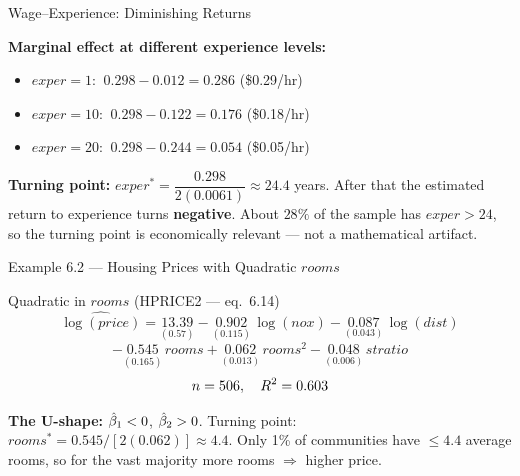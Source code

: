 \documentclass[aspectratio=169, 12pt]{beamer}
\begin{document}
\begin{frame}{Wage--Experience: Diminishing Returns}

  \textbf{Marginal effect at different experience levels:}
  \begin{itemize}
    \item $exper = 1$: $\ 0.298 - 0.012 = 0.286$ (\$0.29/hr)
    \item $exper = 10$: $\ 0.298 - 0.122 = 0.176$ (\$0.18/hr)
    \item $exper = 20$: $\ 0.298 - 0.244 = 0.054$ (\$0.05/hr)
  \end{itemize}

  \medskip

  \begin{keybox}
    \textbf{Turning point:}
    $exper^* = \dfrac{0.298}{2(0.0061)} \approx 24.4$ years. After that the estimated
    return to experience turns \textbf{negative}. About $28\%$ of the sample has
    $exper > 24$, so the turning point is economically relevant --- not a mathematical
    artifact.
  \end{keybox}

\end{frame}

\begin{frame}[shrink=8]{Example 6.2 --- Housing Prices with Quadratic $rooms$}

  \begin{examplebox}{Quadratic in $rooms$ (HPRICE2 --- eq.\ 6.14)}
    \[
      \widehat{\log(price)} = \underset{(0.57)}{13.39}
        - \underset{(0.115)}{0.902}\, \log(nox)
        - \underset{(0.043)}{0.087}\, \log(dist)
    \]
    \[
      - \underset{(0.165)}{0.545}\, rooms
      + \underset{(0.013)}{0.062}\, rooms^2
      - \underset{(0.006)}{0.048}\, stratio
    \]
    \[
      n = 506, \quad R^2 = 0.603
    \]
  \end{examplebox}

  \medskip

  \textbf{The U-shape:} $\hat{\beta}_1 < 0$, $\hat{\beta}_2 > 0$. \quad
  Turning point: $rooms^* = 0.545 / [2(0.062)] \approx 4.4$.
  Only 1\% of communities have $\leq 4.4$ average rooms,
  so for the vast majority more rooms $\Rightarrow$ higher price.

\end{frame}
\end{document}
